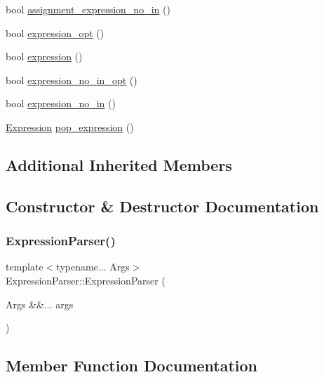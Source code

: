 \begin{DoxyCompactItemize}
\item 
bool \hyperlink{class_expression_parser_ae305699fbb48e4ca2b21393ff53fcb1a}{assignment\+\_\+expression\+\_\+no\+\_\+in} ()
\item 
bool \hyperlink{class_expression_parser_ae0230e10336bfa6fe3572bcd7c55ce88}{expression\+\_\+opt} ()
\item 
bool \hyperlink{class_expression_parser_a67528c5cefc7cc24595f8053741ebd53}{expression} ()
\item 
bool \hyperlink{class_expression_parser_af4f126a24ead195667e0e790dd5e45a0}{expression\+\_\+no\+\_\+in\+\_\+opt} ()
\item 
bool \hyperlink{class_expression_parser_a57e04cb9e8d3ffb5bf816e89c13b5165}{expression\+\_\+no\+\_\+in} ()
\item 
\hyperlink{ast_8h_a4cb273a4d960cd13ea17d08f254493e8}{Expression} \hyperlink{class_expression_parser_a0ffddebda7fa4fe487c8093eeece9c55}{pop\+\_\+expression} ()
\end{DoxyCompactItemize}
\subsection*{Additional Inherited Members}


\subsection{Constructor \& Destructor Documentation}
\mbox{\label{class_expression_parser_a8a408e6f468f529013d43579007e19ea}} 
\subsubsection{\texorpdfstring{Expression\+Parser()}{ExpressionParser()}}
{\footnotesize\ttfamily template$<$typename... Args$>$ \\
Expression\+Parser\+::\+Expression\+Parser (\begin{DoxyParamCaption}\item[{Args \&\&...}]{args }\end{DoxyParamCaption})\hspace{0.3cm}{\ttfamily [inline]}}



\subsection{Member Function Documentation}
\mbox{\label{class_expression_parser_a65cea2c22813de2b19fca563c0ba9f46}} 
